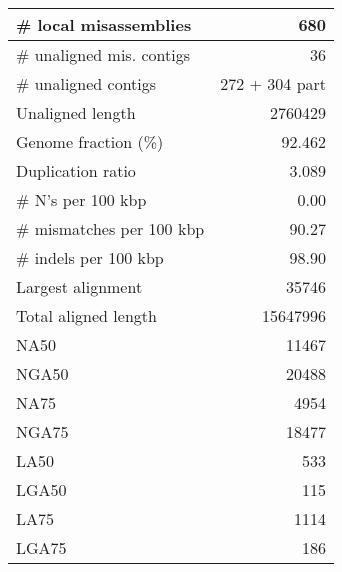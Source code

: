 \documentclass[12pt,a4paper]{article}
\begin{document}
\begin{table}[ht]
\begin{center}
\begin{tabular}{|l*{1}{|r}|}
\# local misassemblies & 680 \\ \hline
\# unaligned mis. contigs & 36 \\ \hline
\# unaligned contigs & 272 + 304 part \\ \hline
Unaligned length & 2760429 \\ \hline
Genome fraction (\%) & 92.462 \\ \hline
Duplication ratio & 3.089 \\ \hline
\# N's per 100 kbp & 0.00 \\ \hline
\# mismatches per 100 kbp & 90.27 \\ \hline
\# indels per 100 kbp & 98.90 \\ \hline
Largest alignment & 35746 \\ \hline
Total aligned length & 15647996 \\ \hline
NA50 & 11467 \\ \hline
NGA50 & 20488 \\ \hline
NA75 & 4954 \\ \hline
NGA75 & 18477 \\ \hline
LA50 & 533 \\ \hline
LGA50 & 115 \\ \hline
LA75 & 1114 \\ \hline
LGA75 & 186 \\ \hline
\end{tabular}
\end{center}
\end{table}
\end{document}
